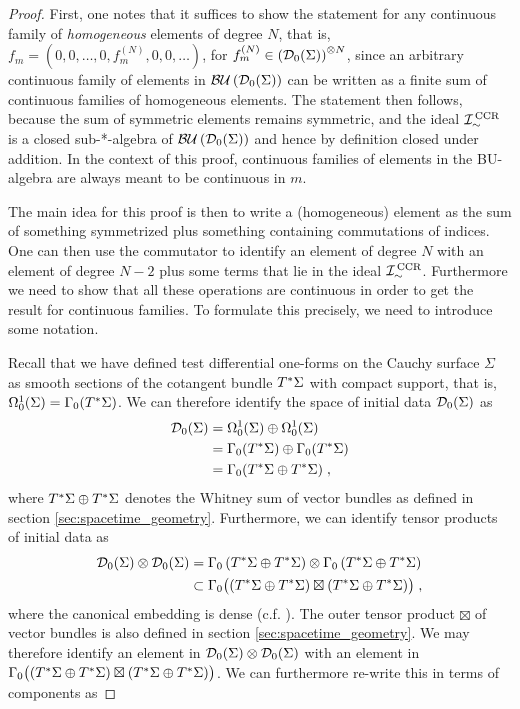\begin{proof}
First, one notes that it suffices to show the statement for any continuous family of \emph{homogeneous} elements of degree $N$, that is, $f_m = (0,0,\dots,0,f^{(N)}_m,0,0,\dots)$, for $f_m^{(N)} \in \left(\mathcal{D}_{0}(\Sigma)\right)^{\otimes N}$, since an arbitrary continuous family of elements in $\mathcal{BU}\left(\mathcal{D}_{0}(\Sigma) \right)$ can be written as a finite sum of continuous families of homogeneous elements. The statement then follows, because the sum of symmetric elements remains symmetric, and the ideal ${\mathcal{I}}_{\sim}^\text{\,CCR}$ is a closed sub-*-algebra of $\mathcal{BU}\left(\mathcal{D}_{0}(\Sigma) \right)$ and hence by definition closed under addition. In the context of this proof, continuous families of elements in the BU-algebra are always meant to be continuous in $m$. 	\par
The main idea for this proof is then to write a (homogeneous) element as the sum of something symmetrized plus something containing commutations of indices. One can then use the commutator to identify an element of degree $N$ with an element of degree $N-2$ plus some terms that lie in the ideal ${\mathcal{I}}_{\sim}^\text{\,CCR}$. Furthermore we need to show that all these operations are continuous in order to get the result for continuous families. To formulate this precisely, we need to introduce some notation.\par
Recall that we have defined test differential one-forms on the Cauchy surface $\Sigma$ as smooth sections of the cotangent bundle $T^*\Sigma$ with compact support, that is, $\Omega^1_0(\Sigma) = \Gamma_0(T^*\Sigma)$. We can therefore identify the space of initial data $\mathcal{D}_{0}(\Sigma)$ as
\begin{align}
	\mathcal{D}_{0}(\Sigma) &= \Omega^1_0(\Sigma) \oplus \Omega^1_0(\Sigma) \notag\\
	&= \Gamma_0(T^*\Sigma) \oplus \Gamma_0(T^*\Sigma) \notag\\
	&= \Gamma_0(T^*\Sigma \oplus T^*\Sigma) \;,
\end{align}
where $T^*\Sigma \oplus T^*\Sigma$ denotes the Whitney sum of vector bundles as defined in section \ref{sec:spacetime_geometry}. Furthermore, we can identify tensor products of initial data as
\begin{align}
	\mathcal{D}_{0}(\Sigma) \otimes \mathcal{D}_{0}(\Sigma) &= \Gamma_0\left( T^*\Sigma \oplus T^*\Sigma \right) \otimes \Gamma_0\left( T^*\Sigma \oplus T^*\Sigma \right) \notag\\
	&\subset \Gamma_0\big( (T^*\Sigma \oplus T^*\Sigma) \boxtimes (T^*\Sigma \oplus T^*\Sigma) \big) \;,
\end{align}
where the canonical embedding is dense (c.f. \cite[Chapter 3.3]{verch_sahlman}). The outer tensor product $\boxtimes$ of vector bundles is also defined in section \ref{sec:spacetime_geometry}. We may therefore identify an element in $\mathcal{D}_{0}(\Sigma) \otimes \mathcal{D}_{0}(\Sigma)$ with an element in $\Gamma_0\big( (T^*\Sigma \oplus T^*\Sigma) \boxtimes (T^*\Sigma \oplus T^*\Sigma) \big) $. We can furthermore re-write this in terms of components as

\end{proof}
